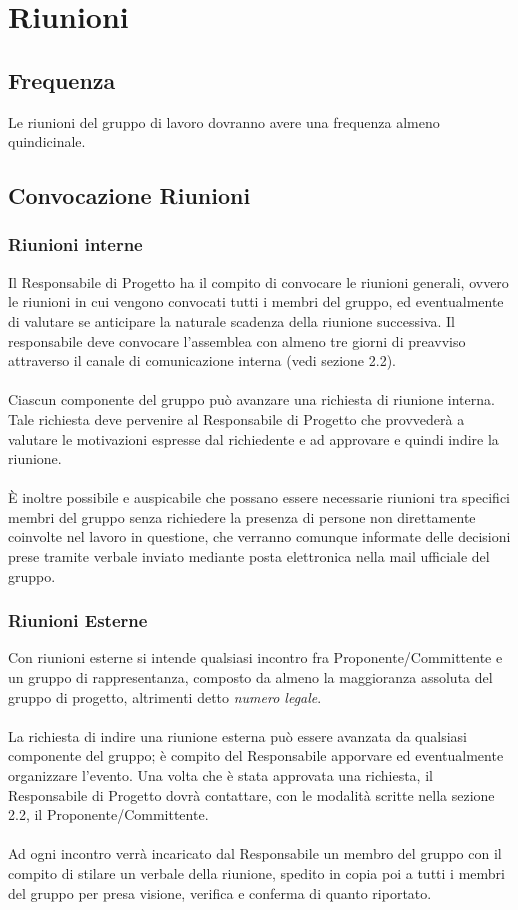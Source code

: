 \section{Riunioni}
\subsection{Frequenza}
Le riunioni del gruppo di lavoro dovranno avere una frequenza almeno quindicinale.
\subsection{Convocazione Riunioni}
\subsubsection{Riunioni interne}
Il Responsabile di Progetto ha il compito di convocare le riunioni generali, ovvero le riunioni in cui vengono convocati tutti i membri del gruppo, ed eventualmente di valutare se anticipare la naturale scadenza della riunione successiva. Il responsabile deve convocare l’assemblea con almeno tre giorni di preavviso attraverso il canale di comunicazione interna (vedi sezione 2.2). \\ \\
Ciascun componente del gruppo può avanzare una richiesta di riunione interna.
Tale richiesta deve pervenire al Responsabile di Progetto che provvederà a valutare le motivazioni espresse dal richiedente e ad approvare e quindi indire la riunione. \\ \\
È inoltre possibile e auspicabile che possano essere necessarie riunioni tra specifici membri del gruppo senza richiedere la presenza di persone non direttamente coinvolte nel lavoro in questione, che verranno comunque informate delle decisioni
prese tramite verbale inviato mediante posta elettronica nella mail ufficiale del gruppo.

\subsubsection{Riunioni Esterne}
Con riunioni esterne si intende qualsiasi incontro fra Proponente/Committente
e un gruppo di rappresentanza, composto da almeno la maggioranza assoluta del
gruppo di progetto, altrimenti detto \textit{numero legale}.\\
\\
La richiesta di indire una riunione esterna può essere avanzata da qualsiasi componente del gruppo; è compito del Responsabile apporvare ed eventualmente organizzare l'evento. Una volta che è stata approvata una richiesta, il Responsabile di Progetto dovrà contattare, con le modalità scritte nella sezione 2.2, il Proponente/Committente.
\\\\
Ad ogni incontro verrà incaricato dal Responsabile un membro del gruppo con il compito di stilare un verbale della riunione, spedito in copia poi a tutti i membri del gruppo per presa visione, verifica e conferma di quanto riportato.